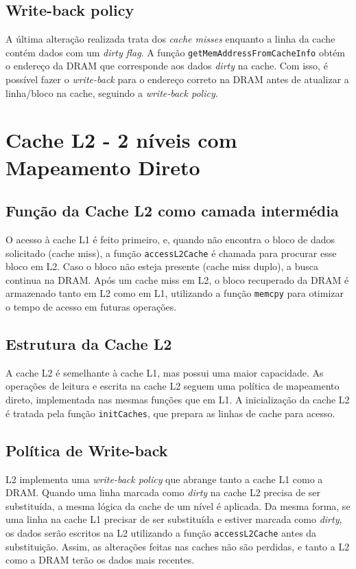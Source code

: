 \documentclass{article}
\begin{document}
\subsection{Write-back policy}
A última alteração realizada trata dos \textit{cache misses} enquanto a linha da cache contém dados com um \textit{dirty flag}. A função \texttt{getMemAddressFromCacheInfo} obtém o endereço da DRAM que corresponde aos dados \textit{dirty} na cache. Com isso, é possível fazer o \textit{write-back} para o endereço correto na DRAM antes de atualizar a linha/bloco na cache, seguindo a \textit{write-back policy}.

\section{Cache L2 - 2 níveis com Mapeamento Direto}

\subsection{Função da Cache L2 como camada intermédia} O acesso à cache L1 é feito primeiro, e, quando não encontra o bloco de dados solicitado (cache miss), a função \texttt{accessL2Cache} é chamada para procurar esse bloco em L2. Caso o bloco não esteja presente (cache miss duplo), a busca continua na DRAM. Após um cache miss em L2, o bloco recuperado da DRAM é armazenado tanto em L2 como em L1, utilizando a função \texttt{memcpy} para otimizar o tempo de acesso em futuras operações. 

\subsection{Estrutura da Cache L2} A cache L2 é semelhante à cache L1, mas possui uma maior capacidade. As operações de leitura e escrita na cache L2 seguem uma política de mapeamento direto, implementada nas mesmas funções que em L1. A inicialização da cache L2 é tratada pela função \texttt{initCaches}, que prepara as linhas de cache para acesso.

\subsection{Política de Write-back} L2 implementa uma \textit{write-back policy} que abrange tanto a cache L1 como a DRAM. Quando uma linha marcada como \textit{dirty} na cache L2 precisa de ser substituída, a mesma lógica da cache de um nível é aplicada. Da mesma forma, se uma linha na cache L1 precisar de ser substituída e estiver marcada como \textit{dirty}, os dados serão escritos na L2 utilizando a função \texttt{accessL2Cache} antes da substituição. Assim, as alterações feitas nas caches não são perdidas, e tanto a L2 como a DRAM terão os dados mais recentes.
\end{document}
